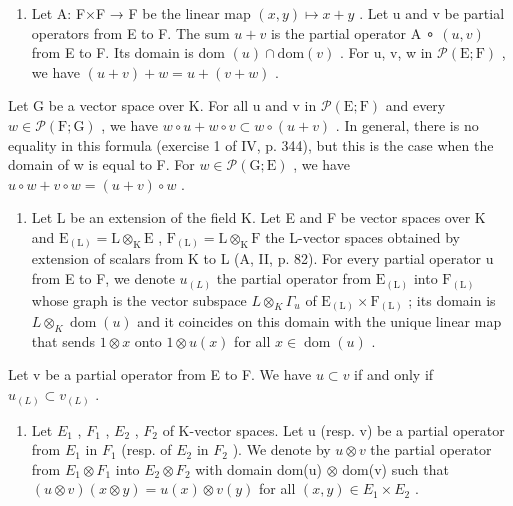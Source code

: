 \begin{enumerate}
\item
  Let A: F×F → F be the linear map \((x,y)\mapsto x+y\) . Let u and v be partial operators from E to F. The sum \(u+v\) is the partial operator A ∘ \((u,v)\) from E to F. Its domain is dom \((u)\cap\text{dom}(v)\) . For u, v, w in \(\mathcal{P}(\text{E};\text{F})\) , we have \((u+v)+w=u+(v+w)\) .
\end{enumerate}

Let G be a vector space over K. For all u and v in \(\mathcal{P}(\mathrm{E};\mathrm{F})\) and every \(w \in \mathcal{P}(\mathrm{F};\mathrm{G})\) , we have \(w \circ u + w \circ v \subset w \circ (u + v)\) . In general, there is no equality in this formula (exercise 1 of IV, p. 344), but this is the case when the domain of w is equal to F. For \(w \in \mathcal{P}(\mathrm{G};\mathrm{E})\) , we have \(u \circ w + v \circ w = (u + v) \circ w\) .

\begin{enumerate}
\def\labelenumi{(\roman{enumi})}
\setcounter{enumi}{6}
\tightlist
\item
  Let L be an extension of the field K. Let E and F be vector spaces over K and \(\mathrm{E}_{(\mathrm{L})} = \mathrm{L} \otimes_{\mathrm{K}} \mathrm{E}\) , \(\mathrm{F}_{(\mathrm{L})} = \mathrm{L} \otimes_{\mathrm{K}} \mathrm{F}\) the L-vector spaces obtained by extension of scalars from K to L (A, II, p. 82). For every partial operator u from E to F, we denote \(u_{(L)}\) the partial operator from \(\mathrm{E}_{(\mathrm{L})}\) into \(\mathrm{F}_{(\mathrm{L})}\) whose graph is the vector subspace \(L \otimes_{K} \Gamma_{u}\) of \(\mathrm{E}_{(\mathrm{L})} \times \mathrm{F}_{(\mathrm{L})}\) ; its domain is \(L \otimes_{K} \operatorname{dom}(u)\) and it coincides on this domain with the unique linear map that sends \(1 \otimes x\) onto \(1 \otimes u(x)\) for all \(x \in \operatorname{dom}(u)\) .
\end{enumerate}

Let v be a partial operator from E to F. We have \(u \subset v\) if and only if \(u_{(L)} \subset v_{(L)}\) .

\begin{enumerate}
\def\labelenumi{(\roman{enumi})}
\setcounter{enumi}{7}
\tightlist
\item
  Let \(E_{1}\) , \(F_{1}\) , \(E_{2}\) , \(F_{2}\) of K-vector spaces. Let u (resp. v) be a partial operator from \(E_{1}\) in \(F_{1}\) (resp. of \(E_{2}\) in \(F_{2}\) ). We denote by \(u \otimes v\) the partial operator from \(E_{1} \otimes F_{1}\) into \(E_{2} \otimes F_{2}\) with domain dom(u) \(\otimes\) dom(v) such that \((u \otimes v)(x \otimes y) = u(x) \otimes v(y)\) for all \((x, y) \in E_{1} \times E_{2}\) .
\end{enumerate}


